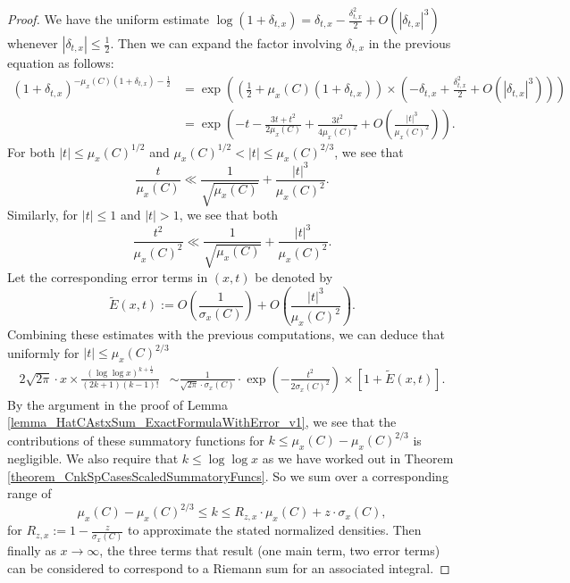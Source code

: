 \documentclass[11pt,reqno,a4letter]{article}
\numberwithin{figure}{section}
\numberwithin{table}{section}
\theoremstyle{plain}
\numberwithin{theorem}{section}
\theoremstyle{definition}
\begin{document}
\begin{proof}
We have the uniform estimate 
$\log(1+\delta_{t,x}) = \delta_{t,x} - \frac{\delta_{t,x}^2}{2} + O(|\delta_{t,x}|^3)$ whenever 
$|\delta_{t,x}| \leq \frac{1}{2}$. Then we can expand the factor involving $\delta_{t,x}$ 
in the previous equation as follows: 
\begin{align*} 
(1+\delta_{t,x})^{-\mu_x(C) (1+\delta_{t,x}) - \frac{1}{2}} & = 
     \exp\left(\left(\frac{1}{2}+\mu_x(C) (1+\delta_{t,x})\right) \times 
     \left(-\delta_{t,x} + \frac{\delta_{t,x}^2}{2} + O(|\delta_{t,x}|^3)\right)\right) \\ 
     & = \exp\left(-t - \frac{3t+t^2}{2\mu_x(C)} + \frac{3t^2}{4\mu_x(C)^2} + 
     O\left(\frac{|t|^3}{\mu_x(C)^2}\right)\right). 
\end{align*} 
For both $|t| \leq \mu_x(C)^{1/2}$ and 
$\mu_x(C)^{1/2} < |t| \leq \mu_x(C)^{2/3}$, 
we see that 
\[
\frac{t}{\mu_x(C)} \ll \frac{1}{\sqrt{\mu_x(C)}} + \frac{|t|^3}{\mu_x(C)^2}. 
\]
Similarly, for $|t| \leq 1$ and $|t| > 1$, we see that both 
\[
\frac{t^2}{\mu_x(C)^2} \ll \frac{1}{\sqrt{\mu_x(C)}} + 
     \frac{|t|^3}{\mu_x(C)^2}. 
\] 
Let the corresponding error terms in $(x, t)$ be denoted by 
\[
\widetilde{E}(x, t) := O\left(\frac{1}{\sigma_x(C)}\right) + 
     O\left(\frac{|t|^3}{\mu_x(C)^2}\right). 
\]
Combining these estimates with the previous computations, we can deduce that 
uniformly for $|t| \leq \mu_x(C)^{2/3}$ 
\begin{align*} 
2\sqrt{2\pi} \cdot x \times 
     \frac{(\log\log x)^{k+\frac{1}{2}}}{(2k+1)(k-1)!} & \sim 
     \frac{1}{\sqrt{2\pi} \cdot \sigma_x(C)} 
     \cdot \exp\left(-\frac{t^2}{2\sigma_x(C)^2}\right) \times 
     \left[1 + \widetilde{E}(x, t)\right]. 
\end{align*} 
By the argument in the proof of 
Lemma \ref{lemma_HatCAstxSum_ExactFormulaWithError_v1}, we see that 
the contributions of these summatory functions for 
$k \leq \mu_x(C) - \mu_x(C)^{2/3}$ is negligible. 
We also require that $k \leq \log\log x$ as we have worked out in 
Theorem \ref{theorem_CnkSpCasesScaledSummatoryFuncs}. So we sum over a 
corresponding range of 
\[
\mu_x(C) -\mu_x(C)^{2/3} \leq k \leq R_{z,x} \cdot \mu_x(C) + z \cdot \sigma_x(C), 
\] 
for $R_{z,x} := 1 - \frac{z}{\sigma_x(C)}$ to approximate the 
stated normalized densities. 
Then finally as $x \rightarrow \infty$, the 
three terms that result (one main term, two error terms) 
can be considered to correspond to a Riemann sum for an associated integral. 
\end{proof} 
\end{document}
